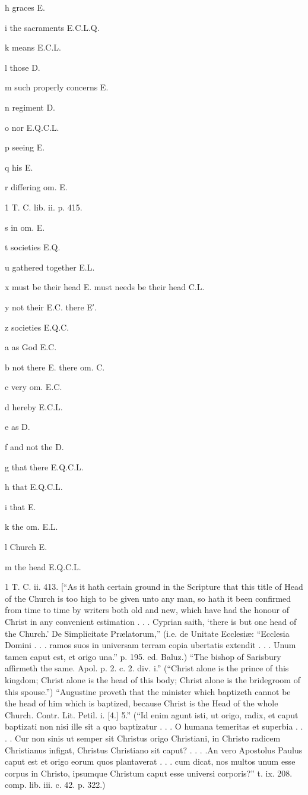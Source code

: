 h
graces E.

i
the sacraments E.C.L.Q.

k
means E.C.L.

l
those D.

m
such properly concerns E.

n
regiment D.

o
nor E.Q.C.L.

p
seeing E.

q
his E.

r
differing om. E.

1
T. C. lib. ii. p. 415.

s
in om. E.

t
societies E.Q.

u
gathered together E.L.

x
must be their head E. must needs be their head C.L.

y
not their E.C. there E′.

z
societies E.Q.C.

a
as God E.C.

b
not there E. there om. C.

c
very om. E.C.

d
hereby E.C.L.

e
as D.

f
and not the D.

g
that there E.Q.C.L.

h
that E.Q.C.L.

i
that E.

k
the om. E.L.

l
Church E.

m
the head E.Q.C.L.

1
T. C. ii. 413. [“As it hath certain ground in the Scripture that this title of Head of the Church is too high to be given unto any man, so hath it been confirmed from time to time by writers both old and new, which have had the honour of Christ in any convenient estimation . . . Cyprian saith, ‘there is but one head of the Church.’ De Simplicitate Prælatorum,” (i.e. de Unitate Ecclesiæ: “Ecclesia Domini . . . ramos suos in universam terram copia ubertatis extendit . . . Unum tamen caput est, et origo una.” p. 195. ed. Baluz.) “The bishop of Sarisbury affirmeth the same. Apol. p. 2. c. 2. div. i.” (“Christ alone is the prince of this kingdom; Christ alone is the head of this body; Christ alone is the bridegroom of this spouse.”) “Augustine proveth that the minister which baptizeth cannot be the head of him which is baptized, because Christ is the Head of the whole Church. Contr. Lit. Petil. i. [4.] 5.” (“Id enim agunt isti, ut origo, radix, et caput baptizati non nisi ille sit a quo baptizatur . . . O humana temeritas et superbia . . . . Cur non sinis ut semper sit Christus origo Christiani, in Christo radicem Christianus infigat, Christus Christiano sit caput? . . . .An vero Apostolus Paulus caput est et origo eorum quos plantaverat . . . cum dicat, nos multos unum esse corpus in Christo, ipsumque Christum caput esse universi corporis?” t. ix. 208. comp. lib. iii. c. 42. p. 322.)

